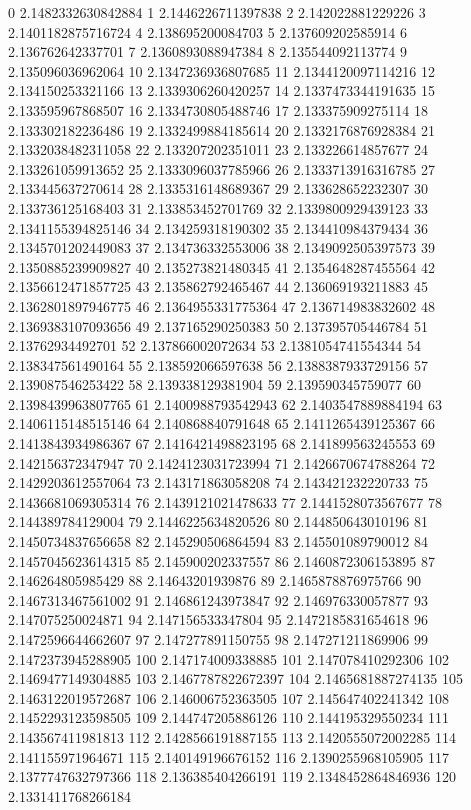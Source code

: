 0 2.1482332630842884
1 2.1446226711397838
2 2.142022881229226
3 2.1401182875716724
4 2.138695200084703
5 2.137609202585914
6 2.136762642337701
7 2.1360893088947384
8 2.135544092113774
9 2.135096036962064
10 2.1347236936807685
11 2.1344120097114216
12 2.134150253321166
13 2.1339306260420257
14 2.1337473344191635
15 2.133595967868507
16 2.1334730805488746
17 2.133375909275114
18 2.133302182236486
19 2.1332499884185614
20 2.1332176876928384
21 2.1332038482311058
22 2.133207202351011
23 2.133226614857677
24 2.133261059913652
25 2.1333096037785966
26 2.1333713916316785
27 2.133445637270614
28 2.1335316148689367
29 2.133628652232307
30 2.133736125168403
31 2.133853452701769
32 2.1339800929439123
33 2.1341155394825146
34 2.134259318190302
35 2.134410984379434
36 2.1345701202449083
37 2.134736332553006
38 2.1349092505397573
39 2.1350885239909827
40 2.135273821480345
41 2.1354648287455564
42 2.1356612471857725
43 2.135862792465467
44 2.136069193211883
45 2.1362801897946775
46 2.1364955331775364
47 2.136714983832602
48 2.1369383107093656
49 2.137165290250383
50 2.137395705446784
51 2.13762934492701
52 2.137866002072634
53 2.1381054741554344
54 2.138347561490164
55 2.138592066597638
56 2.1388387933729156
57 2.139087546253422
58 2.139338129381904
59 2.139590345759077
60 2.1398439963807765
61 2.1400988793542943
62 2.1403547889884194
63 2.1406115148515146
64 2.140868840791648
65 2.1411265439125367
66 2.1413843934986367
67 2.1416421498823195
68 2.141899563245553
69 2.142156372347947
70 2.1424123031723994
71 2.1426670674788264
72 2.1429203612557064
73 2.143171863058208
74 2.143421232220733
75 2.1436681069305314
76 2.1439121021478633
77 2.1441528073567677
78 2.144389784129004
79 2.1446225634820526
80 2.144850643010196
81 2.1450734837656658
82 2.145290506864594
83 2.145501089790012
84 2.1457045623614315
85 2.145900202337557
86 2.1460872306153895
87 2.146264805985429
88 2.14643201939876
89 2.1465878876975766
90 2.1467313467561002
91 2.146861243973847
92 2.146976330057877
93 2.147075250024871
94 2.147156533347804
95 2.1472185831654618
96 2.1472596644662607
97 2.147277891150755
98 2.147271211869906
99 2.1472373945288905
100 2.147174009338885
101 2.147078410292306
102 2.1469477149304885
103 2.1467787822672397
104 2.1465681887274135
105 2.1463122019572687
106 2.146006752363505
107 2.145647402241342
108 2.1452293123598505
109 2.144747205886126
110 2.144195329550234
111 2.143567411981813
112 2.1428566191887155
113 2.1420555072002285
114 2.141155971964671
115 2.140149196676152
116 2.1390255968105905
117 2.1377747632797366
118 2.136385404266191
119 2.1348452864846936
120 2.1331411768266184
